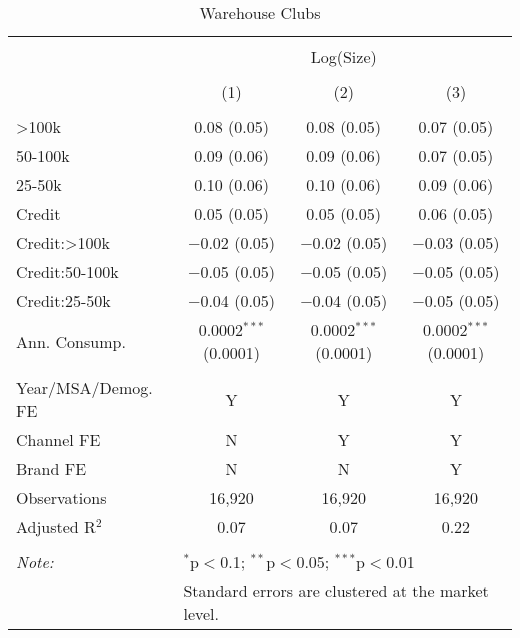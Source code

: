 
\begin{table}[!htbp] \centering 
  \caption{Warehouse Clubs} 
  \label{tab:packageSizeWarehouseDetergent} 
\begin{tabular}{@{\extracolsep{5pt}}lccc} 
\\[-1.8ex]\hline 
\hline \\[-1.8ex] 
 & \multicolumn{3}{c}{Log(Size)} \\ 
\\[-1.8ex] & (1) & (2) & (3)\\ 
\hline \\[-1.8ex] 
 >100k & 0.08 (0.05) & 0.08 (0.05) & 0.07 (0.05) \\ 
  50-100k & 0.09 (0.06) & 0.09 (0.06) & 0.07 (0.05) \\ 
  25-50k & 0.10 (0.06) & 0.10 (0.06) & 0.09 (0.06) \\ 
  Credit & 0.05 (0.05) & 0.05 (0.05) & 0.06 (0.05) \\ 
  Credit:>100k & $-$0.02 (0.05) & $-$0.02 (0.05) & $-$0.03 (0.05) \\ 
  Credit:50-100k & $-$0.05 (0.05) & $-$0.05 (0.05) & $-$0.05 (0.05) \\ 
  Credit:25-50k & $-$0.04 (0.05) & $-$0.04 (0.05) & $-$0.05 (0.05) \\ 
  Ann. Consump. & 0.0002$^{***}$ (0.0001) & 0.0002$^{***}$ (0.0001) & 0.0002$^{***}$ (0.0001) \\ 
 \hline \\[-1.8ex] 
Year/MSA/Demog. FE & Y & Y & Y \\ 
Channel FE & N & Y & Y \\ 
Brand FE & N & N & Y \\ 
Observations & 16,920 & 16,920 & 16,920 \\ 
Adjusted R$^{2}$ & 0.07 & 0.07 & 0.22 \\ 
\hline 
\hline \\[-1.8ex] 
\textit{Note:}  & \multicolumn{3}{l}{$^{*}$p$<$0.1; $^{**}$p$<$0.05; $^{***}$p$<$0.01} \\ 
 & \multicolumn{3}{l}{Standard errors are clustered at the market level.} \\ 
\end{tabular} 
\end{table} 
